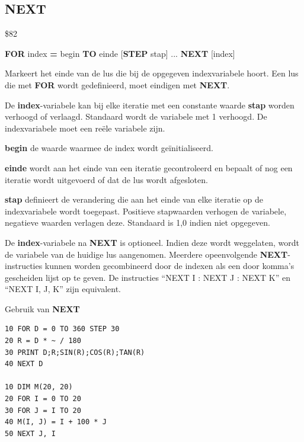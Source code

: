 \subsection{NEXT}
\begin{description}[leftmargin=2cm,style=nextline]
\item [Token:]    \$82

\item [Formaat:]   {\bf FOR} index {\bf =} begin {\bf TO} einde [{\bf STEP} stap] ... {\bf NEXT} [index]

\item [Gebruik:]    Markeert het einde van de lus die bij de opgegeven indexvariabele hoort. Een lus die met {\bf FOR} wordt gedefinieerd, moet eindigen met {\bf NEXT}.

                  De {\bf index}-variabele kan bij elke iteratie met een constante waarde {\bf stap} worden verhoogd of verlaagd. Standaard wordt de variabele met 1 verhoogd. De indexvariabele moet een reële variabele zijn.

                  {\bf begin} de waarde waarmee de index wordt geïnitialiseerd.

{\bf einde} wordt aan het einde van een iteratie gecontroleerd en bepaalt of nog een iteratie wordt uitgevoerd of dat de lus wordt afgesloten.

                  {\bf stap} definieert de verandering die aan het einde van elke iteratie op de indexvariabele wordt toegepast. Positieve stapwaarden verhogen de variabele, negatieve waarden verlagen deze. Standaard is 1,0 indien niet opgegeven.

\item [Opmerkingen:]  De {\bf index}-variabele na {\bf NEXT} is optioneel. Indien deze wordt weggelaten, wordt de variabele van de huidige lus aangenomen. Meerdere opeenvolgende {\bf NEXT}-instructies kunnen worden gecombineerd door de indexen als een door komma's gescheiden lijst op te geven. De instructies ``NEXT I : NEXT J : NEXT K'' en ``NEXT I, J, K'' zijn equivalent.

\item [Voorbeelden:] Gebruik van {\bf NEXT}

\begin{tcolorbox}[colback=black,coltext=white]
\verbatimfont{\codefont}
\begin{verbatim}
10 FOR D = 0 TO 360 STEP 30
20 R = D * ~ / 180
30 PRINT D;R;SIN(R);COS(R);TAN(R)
40 NEXT D

10 DIM M(20, 20)
20 FOR I = 0 TO 20
30 FOR J = I TO 20
40 M(I, J) = I + 100 * J
50 NEXT J, I
\end{verbatim}
\end{tcolorbox}
\end{description}

